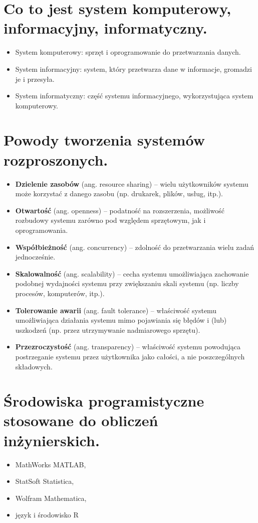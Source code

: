 \documentclass[12pt,a4paper]{article}
\begin{document}
	\section{Co to jest system komputerowy, informacyjny, informatyczny.}
	\begin{itemize}	
		\item System komputerowy: sprzęt i oprogramowanie do przetwarzania danych. 
		\item System informacyjny: system, który przetwarza dane w informacje, gromadzi je i przesyła. 
		\item System informatyczny: część systemu informacyjnego, wykorzystująca system komputerowy.
	\end{itemize}


	\section{Powody tworzenia systemów rozproszonych.}
	\begin{itemize}
		\item \textbf{Dzielenie zasobów} (ang. resource sharing) – wielu użytkowników systemu może korzystać z danego zasobu (np. drukarek, plików, usług, itp.).
		
		\item \textbf{Otwartość} (ang. openness) – podatność na rozszerzenia, możliwość rozbudowy systemu zarówno pod względem sprzętowym, jak i oprogramowania.
		
		\item \textbf{Współbieżność} (ang. concurrency) – zdolność do przetwarzania wielu zadań jednocześnie.
		
		\item \textbf{Skalowalność} (ang. scalability) – cecha systemu umożliwiająca zachowanie podobnej wydajności systemu przy zwiększaniu skali systemu (np. liczby procesów, komputerów, itp.).
		
		\item \textbf{Tolerowanie awarii} (ang. fault tolerance) – właściwość systemu umożliwiająca działania systemu mimo pojawiania się błędów i (lub) uszkodzeń (np. przez utrzymywanie nadmiarowego sprzętu).
		
		\item \textbf{Przezroczystość} (ang. transparency) – właściwość systemu powodująca postrzeganie systemu przez użytkownika jako całości, a nie poszczególnych składowych.
	\end{itemize}

	\section{Środowiska programistyczne stosowane do obliczeń inżynierskich.}
	\begin{itemize}
		\item MathWorks MATLAB,
		\item StatSoft Statistica,
		\item Wolfram Mathematica,
		\item język i środowisko R
	\end{itemize}
\end{document}
